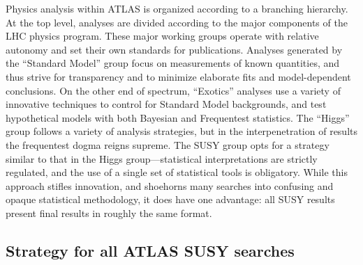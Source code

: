 
Physics analysis within ATLAS is organized according to a branching hierarchy. At the top level, analyses are divided according to the major components of the LHC physics program. These major working groups operate with relative autonomy and set their own standards for publications. Analyses generated by the ``Standard Model'' group focus on measurements of known quantities, and thus strive for transparency and to minimize elaborate fits and model-dependent conclusions. On the other end of spectrum, ``Exotics'' analyses use a variety of innovative techniques to control for Standard Model backgrounds, and test hypothetical models with both Bayesian and Frequentest statistics. The ``Higgs'' group follows a variety of analysis strategies, but in the interpenetration of results the frequentest dogma reigns supreme. The SUSY group opts for a strategy similar to that in the Higgs group---statistical interpretations are strictly regulated, and the use of a single set of statistical tools is obligatory. While this approach stifles innovation, and shoehorns many searches into confusing and opaque statistical methodology, it does have one advantage: all SUSY results present final results in roughly the same format.

\subsection{Strategy for all ATLAS SUSY searches}

